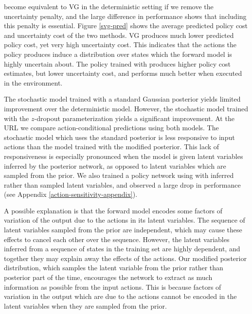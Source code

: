\documentclass{article} %
\begin{document}
\modelnamedrop become equivalent to VG in the deterministic setting if we remove the uncertainty penalty, and the large difference in performance shows that including this penalty is essential.
Figure \ref{svg-pred} shows the average predicted policy cost and uncertainty cost of the two methods.
VG produces much lower predicted policy cost, yet very high uncertainty cost. This indicates that the actions the policy produces induce a distribution over states which the forward model is highly uncertain about. The policy trained with \modelnamedrop produces higher policy cost estimates, but lower uncertainty cost, and performs much better when executed in the environment.

The stochastic model trained with a standard Gaussian posterior yields limited improvement over the deterministic model. 
However, the stochastic model trained with the $z$-dropout parameterization yields a significant improvement. 
At the URL we compare action-conditional predictions using both models.
The stochastic model which uses the standard posterior is less responsive to input actions than the model trained with the modified posterior. 
This lack of responsiveness is especially pronounced when the model is given latent variables inferred by the posterior network, as opposed to latent variables which are sampled from the prior.
We also trained a policy network using \modelnamedrop with inferred rather than sampled latent variables, and observed a large drop in performance (see Appendix \ref{action-sensitivity-appendix}).

A possible explanation is that the forward model encodes some factors of variation of the output due to the actions in its latent variables.
The sequence of latent variables sampled from the prior are independent, which may cause these effects to cancel each other over the sequence. However, the latent variables inferred from a sequence of states in the training set are highly dependent, and together they may explain away the effects of the actions.
Our modified posterior distribution, which samples the latent variable from the prior rather than posterior part of the time, encourages the network to extract as much information as possible from the input actions. This is because factors of variation in the output which are due to the actions cannot be encoded in the latent variables when they are sampled from the prior. 
\end{document}
